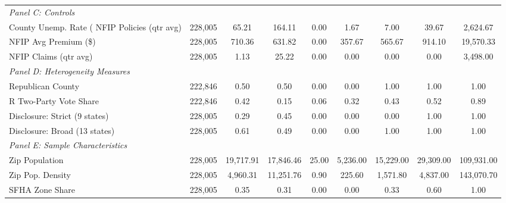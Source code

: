 \begin{table}[htbp]
{\begin{tabular}{l*{1}{cccccccc}}
\textit{Panel C: Controls}&            &            &            &            &            &            &            &            \\
County Unemp. Rate (%
NFIP Policies (qtr avg)&     228,005&       65.21&      164.11&        0.00&        1.67&        7.00&       39.67&    2,624.67\\
NFIP Avg Premium (\$)&     228,005&      710.36&      631.82&        0.00&      357.67&      565.67&      914.10&   19,570.33\\
NFIP Claims (qtr avg)&     228,005&        1.13&       25.22&        0.00&        0.00&        0.00&        0.00&    3,498.00\\
\textit{Panel D: Heterogeneity Measures}&            &            &            &            &            &            &            &            \\
Republican County   &     222,846&        0.50&        0.50&        0.00&        0.00&        1.00&        1.00&        1.00\\
R Two-Party Vote Share&     222,846&        0.42&        0.15&        0.06&        0.32&        0.43&        0.52&        0.89\\
Disclosure: Strict (9 states)&     228,005&        0.29&        0.45&        0.00&        0.00&        0.00&        1.00&        1.00\\
Disclosure: Broad (13 states)&     228,005&        0.61&        0.49&        0.00&        0.00&        1.00&        1.00&        1.00\\
\textit{Panel E: Sample Characteristics}&            &            &            &            &            &            &            &            \\
Zip Population      &     228,005&   19,717.91&   17,846.46&       25.00&    5,236.00&   15,229.00&   29,309.00&  109,931.00\\
Zip Pop. Density    &     228,005&    4,960.31&   11,251.76&        0.90&      225.60&    1,571.80&    4,837.00&  143,070.70\\
SFHA Zone Share     &     228,005&        0.35&        0.31&        0.00&        0.00&        0.33&        0.60&        1.00\\
\hline\hline
\end{tabular}
}%
\end{table}

